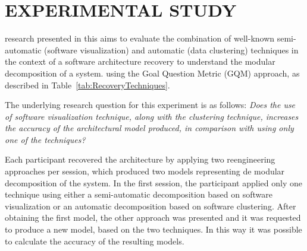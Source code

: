 \section{EXPERIMENTAL STUDY}\label{sec:experiment}

  research presented in this  aims to evaluate the combination
of well-known semi-automatic (software visualization) and automatic (data clustering) techniques in the context of a 
software architecture recovery to understand the modular decomposition of a system.  using the 
Goal Question Metric (GQM) approach, as described in Table~\ref{tab:RecoveryTechniques}.

\begin{table}
	\centering
	\caption{Definition of the accuracy evaluation Software Architecture Recovery Techniques.}
	\label{tab:RecoveryTechniques}
\end{table}

The underlying research question for this experiment is as follows: 
\emph{Does the use of software visualization technique, along with the clustering technique, increases the 
accuracy of the architectural model produced, in comparison with using only one of the techniques?}
 
Each participant recovered the architecture by 
applying two reengineering approaches per session, which produced two models 
representing de modular decomposition of the system. 
In the first session, the participant 
applied only one technique using either a semi-automatic decomposition 
based on software visualization or an automatic decomposition 
based on software clustering. 
After obtaining the first model, the other approach was presented and 
it was requested to produce a new model, based on the two techniques. 
In this way it was possible 
to calculate the accuracy of the resulting models.


